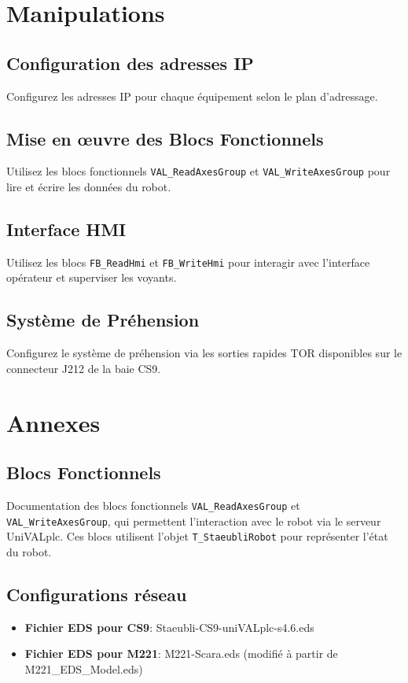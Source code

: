 \documentclass{UPSTI_Document}
\begin{document}
\section{Manipulations}
\begin{UPSTIactivite}
    \subsection{Configuration des adresses IP}
    Configurez les adresses IP pour chaque équipement selon le plan d'adressage.

    \subsection{Mise en œuvre des Blocs Fonctionnels}
    Utilisez les blocs fonctionnels \texttt{VAL\_ReadAxesGroup} et \texttt{VAL\_WriteAxesGroup} pour lire et écrire les données du robot.

    \subsection{Interface HMI}
    Utilisez les blocs \texttt{FB\_ReadHmi} et \texttt{FB\_WriteHmi} pour interagir avec l'interface opérateur et superviser les voyants.

    \subsection{Système de Préhension}
    Configurez le système de préhension via les sorties rapides TOR disponibles sur le connecteur J212 de la baie CS9.
\end{UPSTIactivite}

\section{Annexes}
\subsection{Blocs Fonctionnels}
Documentation des blocs fonctionnels \texttt{VAL\_ReadAxesGroup} et \texttt{VAL\_WriteAxesGroup}, qui permettent l'interaction avec le robot via 
le serveur UniVALplc. Ces blocs utilisent l'objet \texttt{T\_StaeubliRobot} pour représenter l'état du robot.

\subsection{Configurations réseau}
\begin{itemize}
    \item \textbf{Fichier EDS pour CS9}: Staeubli-CS9-uniVALplc-s4.6.eds
    \item \textbf{Fichier EDS pour M221}: M221-Scara.eds (modifié à partir de M221\_EDS\_Model.eds)
\end{itemize}
\end{document}
